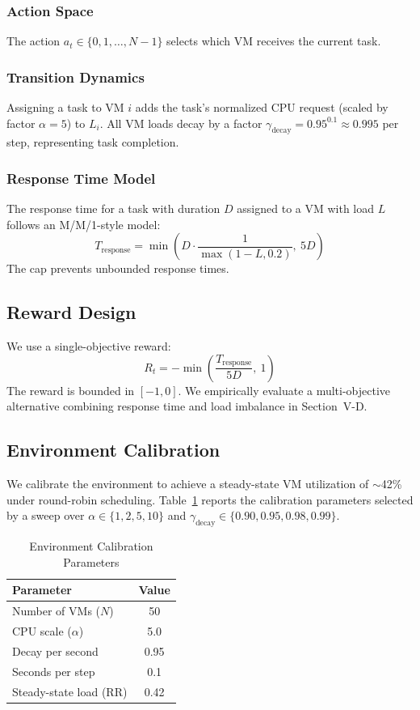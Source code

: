 \documentclass[conference]{IEEEtran}
\begin{document}
\subsubsection{Action Space}
The action $a_t \in \{0, 1, \ldots, N-1\}$ selects which VM receives the current task.

\subsubsection{Transition Dynamics}
Assigning a task to VM $i$ adds the task's normalized CPU request (scaled by factor $\alpha=5$) to $L_i$. All VM loads decay by a factor $\gamma_{\text{decay}} = 0.95^{0.1} \approx 0.995$ per step, representing task completion.

\subsubsection{Response Time Model}
The response time for a task with duration $D$ assigned to a VM with load $L$ follows an M/M/1-style model:
\begin{equation}
T_{\text{response}} = \min\left( D \cdot \frac{1}{\max(1-L, 0.2)},\ 5D \right)
\end{equation}
The cap prevents unbounded response times.

\subsection{Reward Design}

We use a single-objective reward:
\begin{equation}
R_t = -\min\left( \frac{T_{\text{response}}}{5D},\ 1 \right)
\end{equation}
The reward is bounded in $[-1, 0]$. We empirically evaluate a multi-objective alternative combining response time and load imbalance in Section~V-D.

\subsection{Environment Calibration}

We calibrate the environment to achieve a steady-state VM utilization of $\sim$42\% under round-robin scheduling. Table~\ref{tab:calibration} reports the calibration parameters selected by a sweep over $\alpha \in \{1,2,5,10\}$ and $\gamma_{\text{decay}} \in \{0.90, 0.95, 0.98, 0.99\}$.

\begin{table}[h]
\caption{Environment Calibration Parameters}
\label{tab:calibration}
\centering
\begin{tabular}{lc}
\toprule
Parameter & Value \\
\midrule
Number of VMs ($N$) & 50 \\
CPU scale ($\alpha$) & 5.0 \\
Decay per second & 0.95 \\
Seconds per step & 0.1 \\
Steady-state load (RR) & 0.42 \\
\bottomrule
\end{tabular}
\end{table}
\end{document}
